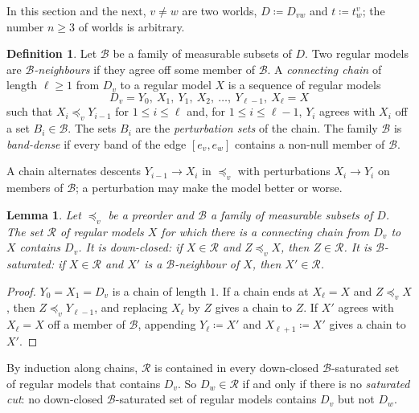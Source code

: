 \documentclass[11pt]{article}
\newtheorem{lemma}[theorem]{Lemma}
\theoremstyle{definition}\newtheorem{definition}[theorem]{Definition}
\theoremstyle{remark}\newtheorem{remark}[theorem]{Remark}
\newcommand{\Bfam}{\mathcal B}
\begin{document}
In this section and the next, $v\ne w$ are two worlds, $D\coloneqq D_{vw}$
and $t\coloneqq t^v_w$; the number $n\ge3$ of worlds is arbitrary.

\begin{definition}\label{def:chain}
Let $\Bfam$ be a family of measurable subsets of $D$. Two regular models are
\emph{$\Bfam$-neighbours} if they agree off some member of $\Bfam$. A
\emph{connecting chain} of length $\ell\ge1$ from $D_v$ to a regular model
$X$ is a sequence of regular models
\[
 D_v=Y_0,\ X_1,\ Y_1,\ X_2,\ \dots,\ Y_{\ell-1},\ X_\ell=X
\]
such that $X_i\preceq_vY_{i-1}$ for $1\le i\le\ell$ and, for
$1\le i\le\ell-1$, $Y_i$ agrees with $X_i$ off a set $B_i\in\Bfam$. The sets
$B_i$ are the \emph{perturbation sets} of the chain. The family $\Bfam$ is
\emph{band-dense} if every band of the edge $[e_v,e_w]$ contains a non-null
member of $\Bfam$.
\end{definition}

A chain alternates descents $Y_{i-1}\to X_i$ in $\preceq_v$ with
perturbations $X_i\to Y_i$ on members of $\Bfam$; a perturbation may make
the model better or worse.

\begin{lemma}\label{lem:reach}
Let $\preceq_v$ be a preorder and $\Bfam$ a family of measurable subsets of
$D$. The set $\mathcal R$ of regular models $X$ for which there is a
connecting chain from $D_v$ to $X$ contains $D_v$. It is
\emph{down-closed}: if $X\in\mathcal R$ and $Z\preceq_vX$, then
$Z\in\mathcal R$. It is \emph{$\Bfam$-saturated}: if $X\in\mathcal R$ and
$X'$ is a $\Bfam$-neighbour of $X$, then $X'\in\mathcal R$.
\end{lemma}
\begin{proof}
$Y_0=X_1=D_v$ is a chain of length $1$. If a chain ends at $X_\ell=X$ and
$Z\preceq_vX$, then $Z\preceq_vY_{\ell-1}$, and replacing $X_\ell$ by $Z$
gives a chain to $Z$. If $X'$ agrees with $X_\ell=X$ off a member of
$\Bfam$, appending $Y_\ell\coloneqq X'$ and $X_{\ell+1}\coloneqq X'$ gives a
chain to $X'$.
\end{proof}

By induction along chains, $\mathcal R$ is contained in every down-closed
$\Bfam$-saturated set of regular models that contains $D_v$. So
$D_w\in\mathcal R$ if and only if there is no \emph{saturated cut}: no
down-closed $\Bfam$-saturated set of regular models contains $D_v$ but not
$D_w$.
\end{document}
